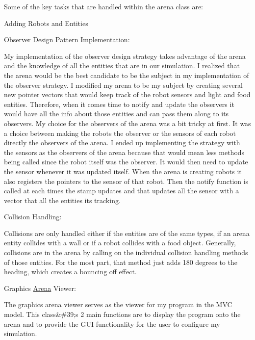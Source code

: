 Some of the key tasks that are handled within the arena class are\+:


\begin{DoxyItemize}
\item Adding Robots and Entities
\item Observer Design Pattern Implementation\+:
\begin{DoxyItemize}
\item My implementation of the observer design strategy takes advantage of the arena and the knowledge of all the entities that are in our simulation. I realized that the arena would be the best candidate to be the subject in my implementation of the observer strategy. I modified my arena to be my subject by creating several new pointer vectors that would keep track of the robot sensors and light and food entities. Therefore, when it comes time to notify and update the observers it would have all the info about those entities and can pass them along to its observers. My choice for the observers of the arena was a bit tricky at first. It was a choice between making the robots the observer or the sensors of each robot directly the observers of the arena. I ended up implementing the strategy with the sensors as the observers of the arena because that would mean less methods being called since the robot itself was the observer. It would then need to update the sensor whenever it was updated itself. When the arena is creating robots it also registers the pointers to the sensor of that robot. Then the notify function is called at each times the stamp updates and that updates all the sensor with a vector that all the entities its tracking.
\end{DoxyItemize}
\item Collision Handling\+:
\begin{DoxyItemize}
\item Collisions are only handled either if the entities are of the same types, if an arena entity collides with a wall or if a robot collides with a food object. Generally, collisions are in the arena by calling on the individual collision handling methods of those entities. For the most part, that method just adds 180 degrees to the heading, which creates a bouncing off effect.
\end{DoxyItemize}
\end{DoxyItemize}

Graphics \mbox{\hyperlink{class_arena}{Arena}} Viewer\+:

The graphics arena viewer serves as the viewer for my program in the M\+VC model. This class\&\#39;s 2 main functions are to display the program onto the arena and to provide the G\+UI functionality for the user to configure my simulation.


